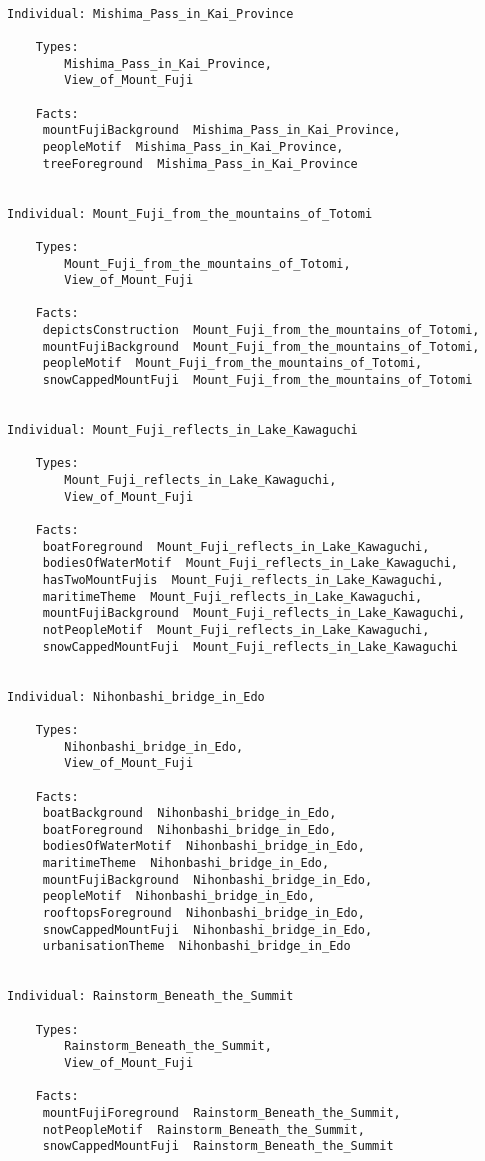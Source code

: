 \documentclass[titlepage,a4paper,12pt,oneside]{book}
\begin{document}
\begin{appendices}
\begin{lstlisting}
    
Individual: Mishima_Pass_in_Kai_Province

    Types: 
        Mishima_Pass_in_Kai_Province,
        View_of_Mount_Fuji
    
    Facts:  
     mountFujiBackground  Mishima_Pass_in_Kai_Province,
     peopleMotif  Mishima_Pass_in_Kai_Province,
     treeForeground  Mishima_Pass_in_Kai_Province
    
    
Individual: Mount_Fuji_from_the_mountains_of_Totomi

    Types: 
        Mount_Fuji_from_the_mountains_of_Totomi,
        View_of_Mount_Fuji
    
    Facts:  
     depictsConstruction  Mount_Fuji_from_the_mountains_of_Totomi,
     mountFujiBackground  Mount_Fuji_from_the_mountains_of_Totomi,
     peopleMotif  Mount_Fuji_from_the_mountains_of_Totomi,
     snowCappedMountFuji  Mount_Fuji_from_the_mountains_of_Totomi
    
    
Individual: Mount_Fuji_reflects_in_Lake_Kawaguchi

    Types: 
        Mount_Fuji_reflects_in_Lake_Kawaguchi,
        View_of_Mount_Fuji
    
    Facts:  
     boatForeground  Mount_Fuji_reflects_in_Lake_Kawaguchi,
     bodiesOfWaterMotif  Mount_Fuji_reflects_in_Lake_Kawaguchi,
     hasTwoMountFujis  Mount_Fuji_reflects_in_Lake_Kawaguchi,
     maritimeTheme  Mount_Fuji_reflects_in_Lake_Kawaguchi,
     mountFujiBackground  Mount_Fuji_reflects_in_Lake_Kawaguchi,
     notPeopleMotif  Mount_Fuji_reflects_in_Lake_Kawaguchi,
     snowCappedMountFuji  Mount_Fuji_reflects_in_Lake_Kawaguchi
    
    
Individual: Nihonbashi_bridge_in_Edo

    Types: 
        Nihonbashi_bridge_in_Edo,
        View_of_Mount_Fuji
    
    Facts:  
     boatBackground  Nihonbashi_bridge_in_Edo,
     boatForeground  Nihonbashi_bridge_in_Edo,
     bodiesOfWaterMotif  Nihonbashi_bridge_in_Edo,
     maritimeTheme  Nihonbashi_bridge_in_Edo,
     mountFujiBackground  Nihonbashi_bridge_in_Edo,
     peopleMotif  Nihonbashi_bridge_in_Edo,
     rooftopsForeground  Nihonbashi_bridge_in_Edo,
     snowCappedMountFuji  Nihonbashi_bridge_in_Edo,
     urbanisationTheme  Nihonbashi_bridge_in_Edo
    
    
Individual: Rainstorm_Beneath_the_Summit

    Types: 
        Rainstorm_Beneath_the_Summit,
        View_of_Mount_Fuji
    
    Facts:  
     mountFujiForeground  Rainstorm_Beneath_the_Summit,
     notPeopleMotif  Rainstorm_Beneath_the_Summit,
     snowCappedMountFuji  Rainstorm_Beneath_the_Summit
    

\end{lstlisting}
\end{appendices}
\end{document}
